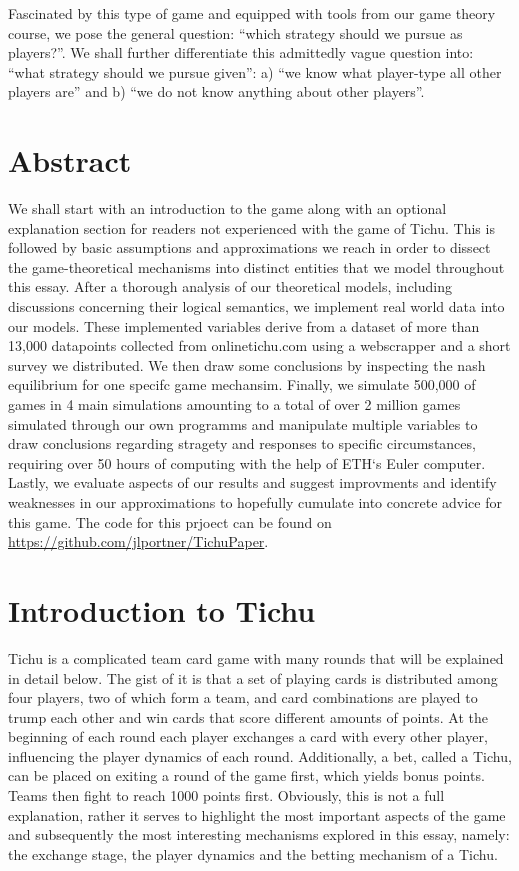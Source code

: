     Fascinated by this type of game and equipped with tools from our game theory course, we pose the general question: “which strategy should we pursue as players?”. We shall further differentiate this admittedly vague question into: “what strategy should we pursue given”: a) “we know what player-type all other players are” and b) “we do not know anything about other players”. 
    
\section*{Abstract}
We shall start with an introduction to the game along with an optional explanation section for readers not experienced with the game of Tichu. This is followed by basic assumptions and approximations we reach in order to dissect the game-theoretical mechanisms into distinct entities that we model throughout this essay. After a thorough analysis of our theoretical models, including discussions concerning their logical semantics, we implement real world data into our models. These implemented variables derive from a dataset of more than 13,000 datapoints collected from onlinetichu.com using a webscrapper and a short survey we distributed. We then draw some conclusions by inspecting the nash equilibrium for one specifc game mechansim. Finally, we simulate 500,000 of games  in 4 main simulations amounting to a total of over 2 million games simulated through our own programms and manipulate multiple variables to draw conclusions regarding stragety and responses to specific circumstances, requiring over 50 hours of computing with the help of ETH‘s Euler computer. Lastly, we evaluate aspects of our results and suggest improvments and identify weaknesses in our approximations to hopefully cumulate into concrete advice for this game. The code for this prjoect can be found on \url{https://github.com/jlportner/TichuPaper}.

\section{Introduction to Tichu}

Tichu is a complicated team card game with many rounds that will be explained in detail below. The gist of it is that a set of playing cards is distributed among four players, two of which form a team, and card combinations are played to trump each other and win cards that score different amounts of points. At the beginning of each round each player exchanges a card with every other player, influencing the player dynamics of each round. Additionally, a bet, called a Tichu, can be placed on exiting a round of the game first, which yields bonus points. Teams then fight to reach 1000 points first. Obviously, this is not a full explanation, rather it serves to highlight the most important aspects of the game and subsequently the most interesting mechanisms explored in this essay, namely: the exchange stage, the player dynamics and the betting mechanism of a Tichu. 

